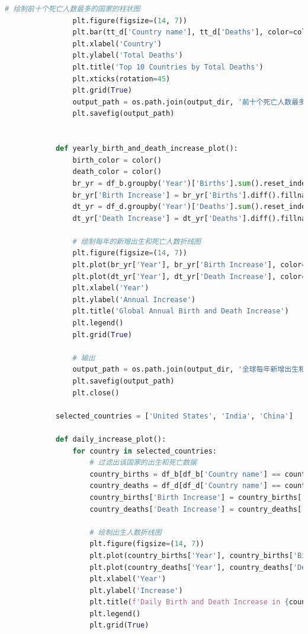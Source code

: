 \documentclass{ctexart}
\begin{document}
\begin{lstlisting}[language=Python]
                # 绘制前十个死亡人数最多的国家的柱状图
                plt.figure(figsize=(14, 7))
                plt.bar(tt_d['Country name'], tt_d['Deaths'], color=color())
                plt.xlabel('Country')
                plt.ylabel('Total Deaths')
                plt.title('Top 10 Countries by Total Deaths')
                plt.xticks(rotation=45)
                plt.grid(True)
                output_path = os.path.join(output_dir, '前十个死亡人数最多的国家的柱状图.png')
                plt.savefig(output_path)


            def yearly_birth_and_death_increase_plot():
                birth_color = color()
                death_color = color()
                br_yr = df_b.groupby('Year')['Births'].sum().reset_index()
                br_yr['Birth Increase'] = br_yr['Births'].diff().fillna(0)
                dt_yr = df_d.groupby('Year')['Deaths'].sum().reset_index()
                dt_yr['Death Increase'] = dt_yr['Deaths'].diff().fillna(0)

                # 绘制每年的新增出生和死亡人数折线图
                plt.figure(figsize=(14, 7))
                plt.plot(br_yr['Year'], br_yr['Birth Increase'], color=birth_color, marker='o', label='Birth Increase')
                plt.plot(dt_yr['Year'], dt_yr['Death Increase'], color=death_color, marker='x', label='Death Increase')
                plt.xlabel('Year')
                plt.ylabel('Annual Increase')
                plt.title('Global Annual Birth and Death Increase')
                plt.legend()
                plt.grid(True)

                # 输出
                output_path = os.path.join(output_dir, '全球每年新增出生和死亡人数的折线图.png')
                plt.savefig(output_path)
                plt.close()

            selected_countries = ['United States', 'India', 'China']

            def daily_increase_plot():
                for country in selected_countries:
                    # 过滤出该国家的出生和死亡数据
                    country_births = df_b[df_b['Country name'] == country].copy()
                    country_deaths = df_d[df_d['Country name'] == country].copy()
                    country_births['Birth Increase'] = country_births['Births'].diff().fillna(0)
                    country_deaths['Death Increase'] = country_deaths['Deaths'].diff().fillna(0)

                    # 绘制出生人数折线图
                    plt.figure(figsize=(14, 7))
                    plt.plot(country_births['Year'], country_births['Birth Increase'], color=color(), marker='o', label='Daily Birth Increase')
                    plt.plot(country_deaths['Year'], country_deaths['Death Increase'], color=color(), marker='x', label='Daily Death Increase')
                    plt.xlabel('Year')
                    plt.ylabel('Increase')
                    plt.title(f'Daily Birth and Death Increase in {country}')
                    plt.legend()
                    plt.grid(True)


\end{lstlisting}
\end{document}
